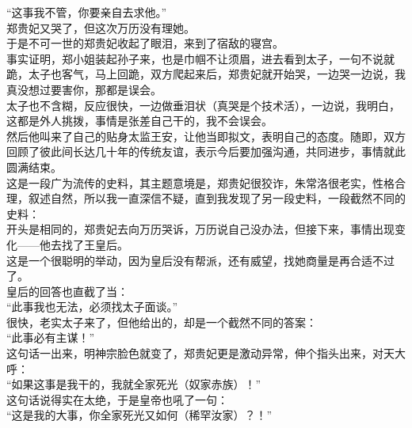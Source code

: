 \begin{multicols}{\theparacolNo}
“这事我不管，你要亲自去求他。”\\

郑贵妃又哭了，但这次万历没有理她。\\

于是不可一世的郑贵妃收起了眼泪，来到了宿敌的寝宫。\\

事实证明，郑小姐装起孙子来，也是巾帼不让须眉，进去看到太子，一句不说就跪，太子也客气，马上回跪，双方爬起来后，郑贵妃就开始哭，一边哭一边说，我真没想过要害你，那都是误会。\\

太子也不含糊，反应很快，一边做垂泪状（真哭是个技术活），一边说，我明白，这都是外人挑拨，事情是张差自己干的，我不会误会。\\

然后他叫来了自己的贴身太监王安，让他当即拟文，表明自己的态度。随即，双方回顾了彼此间长达几十年的传统友谊，表示今后要加强沟通，共同进步，事情就此圆满结束。\\

这是一段广为流传的史料，其主题意境是，郑贵妃很狡诈，朱常洛很老实，性格合理，叙述自然，所以我一直深信不疑，直到我发现了另一段史料，一段截然不同的史料：\\

开头是相同的，郑贵妃去向万历哭诉，万历说自己没办法，但接下来，事情出现变化——他去找了王皇后。\\

这是一个很聪明的举动，因为皇后没有帮派，还有威望，找她商量是再合适不过了。\\

皇后的回答也直截了当：\\

“此事我也无法，必须找太子面谈。”\\

很快，老实太子来了，但他给出的，却是一个截然不同的答案：\\

“此事必有主谋！”\\

这句话一出来，明神宗脸色就变了，郑贵妃更是激动异常，伸个指头出来，对天大呼：\\

“如果这事是我干的，我就全家死光（奴家赤族）！”\\

这句话说得实在太绝，于是皇帝也吼了一句：\\

“这是我的大事，你全家死光又如何（稀罕汝家）？！”\\


\end{multicols}
